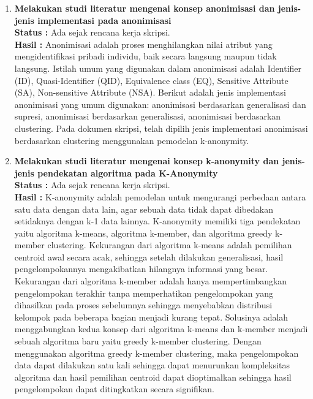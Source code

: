 \documentclass[a4paper,twoside]{article}
\begin{document}
\begin{enumerate}
		\item \textbf{Melakukan studi literatur mengenai konsep anonimisasi dan jenis-jenis implementasi pada anonimisasi}\\
		{\bf Status :} Ada sejak rencana kerja skripsi.\\
		{\bf Hasil :} Anonimisasi adalah proses menghilangkan nilai atribut yang mengidentifikasi pribadi individu, baik secara langsung maupun tidak
langsung. Istilah umum yang digunakan dalam anonimisasi adalah Identifier (ID), Quasi-Identifier (QID), Equivalence class (EQ), Sensitive Attribute (SA), Non-sensitive Attribute (NSA). Berikut adalah jenis implementasi anonimisasi yang umum digunakan: anonimisasi berdasarkan generalisasi dan supresi, anonimisasi berdasarkan generalisasi, anonimisasi berdasarkan clustering. Pada dokumen skripsi, telah dipilih jenis implementasi anonimisasi berdasarkan clustering menggunakan pemodelan k-anonymity.

		\item \textbf{Melakukan studi literatur mengenai konsep k-anonymity dan jenis-jenis pendekatan algoritma pada K-Anonymity}\\
		{\bf Status :} Ada sejak rencana kerja skripsi.\\
		{\bf Hasil :} K-anonymity adalah pemodelan untuk mengurangi perbedaan antara satu data dengan data lain, agar sebuah data tidak dapat dibedakan setidaknya dengan k-1 data lainnya. K-anonymity memiliki tiga pendekatan yaitu algoritma k-means, algoritma k-member, dan algoritma greedy k-member clustering. Kekurangan dari algoritma k-means adalah pemilihan centroid awal  secara acak, sehingga setelah dilakukan generalisasi, hasil pengelompokannya mengakibatkan hilangnya informasi yang besar.  Kekurangan dari algoritma k-member adalah hanya mempertimbangkan pengelompokan terakhir tanpa memperhatikan pengelompokan yang dihasilkan pada proses sebelumnya sehingga menyebabkan distribusi kelompok pada beberapa bagian menjadi kurang tepat. Solusinya adalah menggabungkan kedua konsep dari algoritma k-means dan k-member menjadi sebuah algoritma baru yaitu greedy k-member clustering. Dengan menggunakan algoritma greedy k-member clustering, maka pengelompokan data dapat dilakukan satu kali sehingga dapat menurunkan kompleksitas algoritma dan hasil pemilihan centroid dapat dioptimalkan sehingga hasil pengelompokan dapat ditingkatkan secara signifikan.


\end{enumerate}
\end{document}
